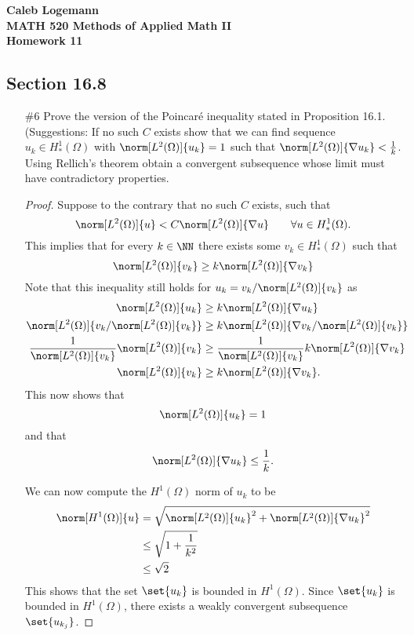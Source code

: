 \documentclass[11pt, oneside]{article}
\begin{document}
\noindent \textbf{\Large{Caleb Logemann \\
MATH 520 Methods of Applied Math II \\
Homework 11
}}

\subsection*{Section 16.8}
\begin{enumerate}
  \item[\#6] %
    Prove the version of the Poincar\'e inequality stated in Proposition 16.1.
    (Suggestions: If no such $C$ exists show that we can find sequence
    $u_k \in H^1_*(\Omega)$ with $\norm[L^2(\Omega)]{u_k} = 1$ such that
    $\norm[L^2(\Omega)]{\nabla u_k} < \frac{1}{k}$.
    Using Rellich's theorem obtain a convergent subsequence whose limit must
    have contradictory properties.

    \begin{proof}
      Suppose to the contrary that no such $C$ exists, such that
      \[
        \norm[L^2(\Omega)]{u} < C \norm[L^2(\Omega)]{\nabla u} \qquad \forall u \in H^1_*(\Omega).
      \]
      This implies that for every $k \in \NN$ there exists some
      $v_k \in H^1_*(\Omega)$ such that
      \[
        \norm[L^2(\Omega)]{v_k} \ge k \norm[L^2(\Omega)]{\nabla v_k}
      \]
      Note that this inequality still holds for
      $u_k = v_k/\norm[L^2(\Omega)]{v_k}$ as
      \begin{align*}
        \norm[L^2(\Omega)]{u_k} &\ge k \norm[L^2(\Omega)]{\nabla u_k} \\
        \norm[L^2(\Omega)]{v_k/\norm[L^2(\Omega)]{v_k}} &\ge k \norm[L^2(\Omega)]{\nabla v_k/\norm[L^2(\Omega)]{v_k}} \\
        \frac{1}{\norm[L^2(\Omega)]{v_k}} \norm[L^2(\Omega)]{v_k} &\ge \frac{1}{\norm[L^2(\Omega)]{v_k}} k \norm[L^2(\Omega)]{\nabla v_k} \\
        \norm[L^2(\Omega)]{v_k} &\ge k \norm[L^2(\Omega)]{\nabla v_k}.
      \end{align*}
      This now shows that
      \[
        \norm[L^2(\Omega)]{u_k} = 1
      \]
      and that
      \[
        \norm[L^2(\Omega)]{\nabla u_k} \le \frac{1}{k}.
      \]

      We can now compute the $H^1(\Omega)$ norm of $u_k$ to be
      \begin{align*}
        \norm[H^1(\Omega)]{u} &= \sqrt{\norm[L^2(\Omega)]{u_k}^2 + \norm[L^2(\Omega)]{\nabla u_k}^2} \\
        &\le \sqrt{1 + \frac{1}{k^2}} \\
        &\le \sqrt{2}
      \end{align*}
      This shows that the set $\set{u_k}$ is bounded in $H^1(\Omega)$.
      Since $\set{u_k}$ is bounded in $H^1(\Omega)$, there exists a weakly
      convergent subsequence $\set{u_{k_j}}$.


\end{proof}
\end{enumerate}
\end{document}
